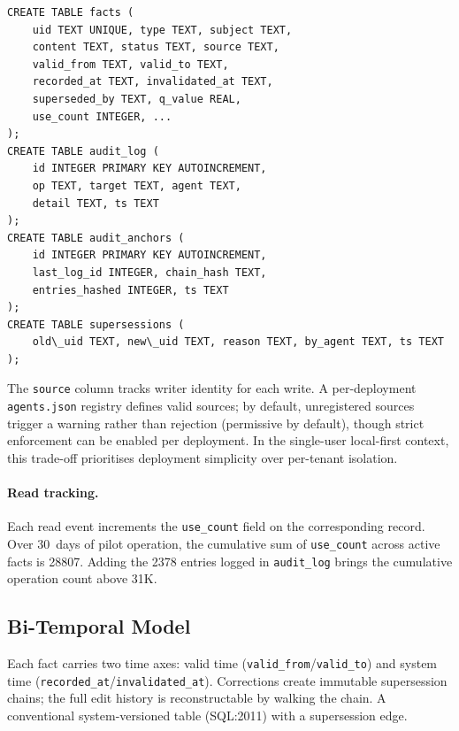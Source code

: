 \documentclass{llncs}
\begin{document}
\begin{verbatim}
CREATE TABLE facts (
    uid TEXT UNIQUE, type TEXT, subject TEXT,
    content TEXT, status TEXT, source TEXT,
    valid_from TEXT, valid_to TEXT,
    recorded_at TEXT, invalidated_at TEXT,
    superseded_by TEXT, q_value REAL,
    use_count INTEGER, ...
);
CREATE TABLE audit_log (
    id INTEGER PRIMARY KEY AUTOINCREMENT,
    op TEXT, target TEXT, agent TEXT,
    detail TEXT, ts TEXT
);
CREATE TABLE audit_anchors (
    id INTEGER PRIMARY KEY AUTOINCREMENT,
    last_log_id INTEGER, chain_hash TEXT,
    entries_hashed INTEGER, ts TEXT
);
CREATE TABLE supersessions (
    old\_uid TEXT, new\_uid TEXT, reason TEXT, by_agent TEXT, ts TEXT
);
\end{verbatim}

The \texttt{source} column tracks writer identity for each write. A per-deployment \texttt{agents.json} registry defines valid sources; by default, unregistered sources trigger a warning rather than rejection (permissive by default), though strict enforcement can be enabled per deployment. In the single-user local-first context, this trade-off prioritises deployment simplicity over per-tenant isolation.

\paragraph{Read tracking.}
Each read event increments the \texttt{use\_count} field on the corresponding record. Over 30~days of pilot operation, the cumulative sum of \texttt{use\_count} across active facts is 28{}807. Adding the 2{}378 entries logged in \texttt{audit\_log} brings the cumulative operation count above 31K.

\subsection{Bi-Temporal Model}
Each fact carries two time axes: valid time (\texttt{valid\_from}/\texttt{valid\_to}) and system time (\texttt{recorded\_at}/\texttt{invalidated\_at}). Corrections create immutable supersession chains; the full edit history is reconstructable by walking the chain. A conventional system-versioned table (SQL:2011) with a supersession edge.
\end{document}
